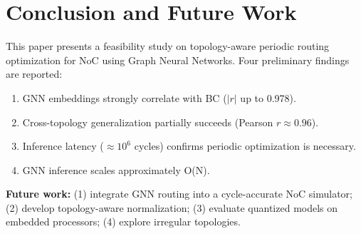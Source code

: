 \documentclass[conference]{IEEEtran}
\begin{document}
\section{Conclusion and Future Work}
\label{sec:conclusion}

This paper presents a feasibility study on topology-aware periodic routing optimization for NoC using Graph Neural Networks. Four preliminary findings are reported:

\begin{enumerate}
    \item GNN embeddings strongly correlate with BC ($|r|$ up to 0.978).
    \item Cross-topology generalization partially succeeds (Pearson $r\approx0.96$).
    \item Inference latency ($\approx10^6$ cycles) confirms periodic optimization is necessary.
    \item GNN inference scales approximately O(N).
\end{enumerate}

\textbf{Future work:} (1) integrate GNN routing into a cycle-accurate NoC simulator; (2) develop topology-aware normalization; (3) evaluate quantized models on embedded processors; (4) explore irregular topologies.

\end{document}
